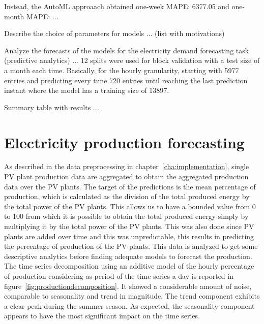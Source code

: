 Instead, the AutoML approaach obtained one-week MAPE: 6377.05 and one-month MAPE: ...



Describe the choice of parameters for models ... (list with motivations)

Analyze the forecasts of the models for the electricity demand forecasting task (predictive analytics) ...
12 splits were used for block validation with a test size of a month each time.
Basically, for the hourly granularity, starting with 5977 entries and predicting every time 720 entries until reaching the last prediction instant where the model has a training size of 13897.

Summary table with results ...


\section{Electricity production forecasting}
\label{sec:productionval}
\vspace{0.2 cm}

As described in the data preprocessing in chapter~\ref{cha:implementation}, single PV plant production data are aggregated to obtain the aggregated production data over the PV plants.
The target of the predictions is the mean percentage of production, which is calculated as the division of the total produced energy by the total power of the PV plants.
This allows us to have a bounded value from 0 to 100 from which it is possible to obtain the total produced energy simply by multiplying it by the total power of the PV plants.
This was also done since PV plants are added over time and this was unpredictable, this results in predicting the percentage of production of the PV plants.
This data is analyzed to get some descriptive analytics before finding adequate models to forecast the production.
The time series decomposition using an additive model of the hourly percentage of production considering as period of the time series a day is reported in figure~\ref{fig:productiondecomposition}.
It showed a considerable amount of noise, comparable to seasonality and trend in magnitude.
The trend component exhibits a clear peak during the summer season.
As expected, the seasonality component appears to have the most significant impact on the time series.

